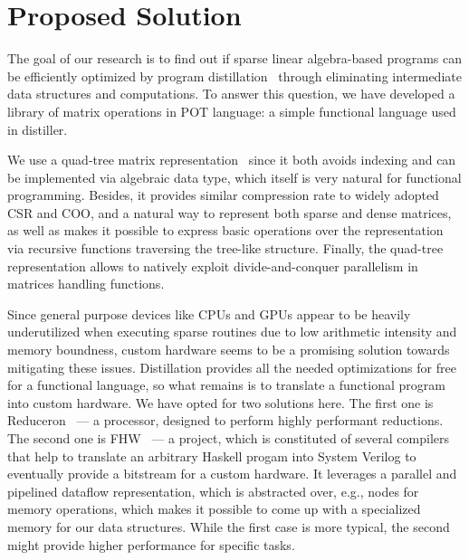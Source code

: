 \section{Proposed Solution}

The goal of our research is to find out if sparse linear algebra-based programs can be efficiently optimized by program distillation~\cite{hamilton2021700} through eliminating intermediate data structures and computations.
To answer this question, we have developed a library of matrix operations
 in POT language: a simple functional language used in distiller.%

We use a quad-tree matrix representation~\cite{qtree} since it both avoids indexing and can be implemented via algebraic data type, which itself is very natural for functional programming.
Besides, it provides similar compression rate to widely adopted CSR and COO, and a natural way to represent both sparse and dense matrices, as well as makes it possible to express basic operations over the representation via recursive functions traversing the tree-like structure.
Finally, the quad-tree representation allows to natively exploit divide-and-conquer parallelism in matrices handling functions.

%
%  
%    
%    

Since general purpose devices like CPUs and GPUs appear to be heavily underutilized when executing sparse routines due to low arithmetic intensity and memory boundness, custom hardware seems to be a promising solution towards mitigating these issues. 
Distillation provides all the needed optimizations for free for a functional language, so what remains is to translate a functional program into custom hardware. We have opted for two solutions here.
The first one is Reduceron~\cite{naylorRunciman2012} --- a processor, designed to perform highly performant reductions.
The second one is FHW~\cite{Edwards2019FHWP} --- a project, which is constituted of several compilers that help to translate an arbitrary Haskell progam into System Verilog to eventually provide a bitstream for a custom hardware.
It leverages a parallel and pipelined dataflow representation, which is abstracted over, e.g., nodes for memory operations, which makes it possible to come up with a specialized memory for our data structures.
While the first case is more typical, the second might provide higher performance for specific tasks.

